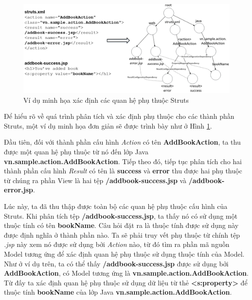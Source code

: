 \documentclass[12pt]{report}
\begin{document}
\begin{figure}[h]
	\centering
	\includegraphics[scale=0.53]{struts-analyzer-sample}
	\caption{Ví dụ minh họa xác định các quan hệ phụ thuộc Struts}
	\label{fig:struts-analyzer-sample}
\end{figure}

Để hiểu rõ về quá trình phân tích và xác định phụ thuộc cho các thành phần Struts, một ví dụ minh họa đơn giản sẽ được trình bày như ở Hình \ref{fig:struts-analyzer-sample}.

Đầu tiên, đối với thành phần cấu hình \textit{Action} có tên \textbf{AddBookAction}, ta thu được một quan hệ phụ thuộc từ nó đến lớp Java \textbf{vn.sample.action.AddBookAction}. Tiếp theo đó, tiếp tục phân tích cho hai thành phần cấu hình \textit{Result} có tên là \textbf{success} và \textbf{error} thu được hai phụ thuộc từ chúng ra phần View là hai tệp \textbf{/addbook-success.jsp} và \textbf{/addbook-error.jsp}.

Lúc này, ta đã thu thập được toàn bộ các quan hệ phụ thuộc cấu hình của Struts. Khi phân tích tệp \textbf{/addbook-success.jsp}, ta thấy nó có sử dụng một thuộc tính có tên \textbf{bookName}. Câu hỏi đặt ra là thuộc tính được sử dụng này được định nghĩa ở thành phần nào. Ta sẽ phải truy vết phụ thuộc từ chính tệp \textit{.jsp} này xem nó được sử dụng bởi \textit{Action} nào, từ đó tìm ra phần mã nguồn Model tương ứng để xác định quan hệ phụ thuộc sử dụng thuộc tính của Model. Như ở ví dụ trên, ta có thể thấy \textbf{/addbook-success.jsp} được sử dụng bởi \textbf{AddBookAction}, có Model tương ứng là \textbf{vn.sample.action.AddBookAction}. Từ đấy ta xác định quan hệ phụ thuộc sử dụng dữ liệu từ thẻ \textbf{<s:property>} để thuộc tính \textbf{bookName} của lớp Java \textbf{vn.sample.action.AddBookAction}.
\end{document}
